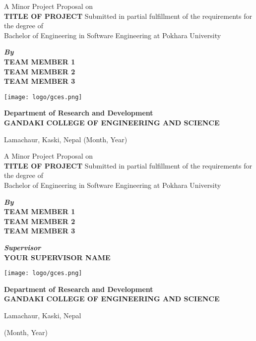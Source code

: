 \begin{titlepage}
		\begin{center}
			A Minor Project Proposal on \\
			\textbf{TITLE OF PROJECT}
			\vskip1cm
			Submitted in partial fulfillment of the requirements for the degree of \\ 
             Bachelor of Engineering in Software Engineering at Pokhara University
			
			\vskip1.5cm
			
			\textbf{\textit{By\\}}
			\textbf{TEAM MEMBER 1 \\ TEAM MEMBER 2 \\ TEAM MEMBER 3}
			
			\vskip2cm
			
			\texttt{[image: logo/gces.png]}
			
			\vskip2cm
			
			\textbf{Department of Research and Development \\ GANDAKI COLLEGE OF ENGINEERING AND SCIENCE}
			
			Lamachaur, Kaski, Nepal
			\vskip1cm
			 (Month, Year)
			
			\newpage
			
			A Minor Project Proposal on \\
			\textbf{TITLE OF PROJECT}
			\vskip1cm
			Submitted in partial fulfillment of the requirements for the degree of \\ 
Bachelor of Engineering in Software Engineering at Pokhara University
			
			
			\vskip1.5cm
			
			\textbf{\textit{By\\}}
			\textbf{TEAM MEMBER 1 \\ TEAM MEMBER 2 \\ TEAM MEMBER 3}
			
			\vskip1cm
			
			\textbf{\textit{Supervisor}}
			\textbf{\\ YOUR SUPERVISOR NAME}			
			
			\vskip1cm
			
			\texttt{[image: logo/gces.png]}
			
			\vskip1cm
			
			\textbf{Department of Research and Development \\ GANDAKI COLLEGE OF ENGINEERING AND SCIENCE}
			
			Lamachaur, Kaski, Nepal
			
			\vskip1cm
			 (Month, Year)

		\end{center}
	\end{titlepage}